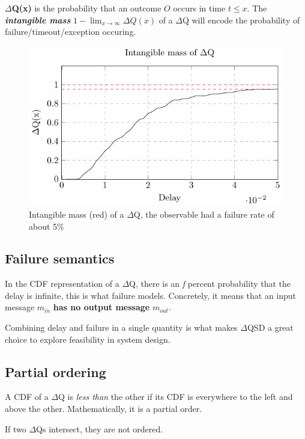     \textbf{$\Delta$Q(x)} is the probability that an outcome $O$ occurs in time $t \le x$. The \textbf{\textit{intangible mass}} $1 - \lim_{x\to\infty}\Delta Q(x)$ of a $\Delta$Q will encode the probability of failure/timeout/exception occuring.
    
    \begin{figure}[H]
        \begin{center}
            \includegraphics{tikz/intangible.pdf}
        \end{center}
        \caption{Intangible mass (red) of a $\Delta$Q, the observable had a failure rate of about 5\% }
    \end{figure}
   
  \subsection{Failure semantics}
       In the CDF representation of a $\Delta$Q, there is an \textit{f} percent probability that the delay is infinite, this is what failure models. 
        Concretely, it means that an input message $m_{in}$ \textbf{has no output message} $m_{out}$.

        Combining delay and failure in a single quantity is what makes $\Delta$QSD a great choice to explore feasibility in system design.
   
    \subsection{Partial ordering}
        A CDF of a $\Delta$Q is \textit{less than} the other if its CDF is everywhere to the left and above the other. Mathematically, it is a partial order. 
        
        If two $\Delta$Qs intersect, they are not ordered.

